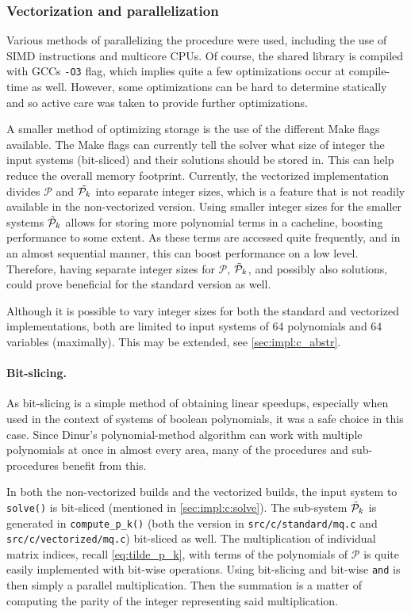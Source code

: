 \subsubsection{Vectorization and parallelization} \label{sec:impl:opt:parallel}
Various methods of parallelizing the procedure were used, including the use of SIMD instructions and multicore CPUs. Of course, the shared library is compiled with GCCs \texttt{-O3} flag, which implies quite a few optimizations occur at compile-time as well. However, some optimizations can be hard to determine statically and so active care was taken to provide further optimizations. 

A smaller method of optimizing storage is the use of the different Make flags available. The Make flags can currently tell the solver what size of integer the input systems (bit-sliced) and their solutions should be stored in. This can help reduce the overall memory footprint. Currently, the vectorized implementation divides $\mathcal{P}$ and $\Tilde{\mathcal{P}_k}$ into separate integer sizes, which is a feature that is not readily available in the non-vectorized version. Using smaller integer sizes for the smaller systems $\Tilde{\mathcal{P}}_k$ allows for storing more polynomial terms in a cacheline, boosting performance to some extent. As these terms are accessed quite frequently, and in an almost sequential manner, this can boost performance on a low level. Therefore, having separate integer sizes for $\mathcal{P}$, $\Tilde{\mathcal{P}}_k$, and possibly also solutions, could prove beneficial for the standard version as well.

Although it is possible to vary integer sizes for both the standard and vectorized implementations, both are limited to input systems of 64 polynomials and 64 variables (maximally). This may be extended, see \cref{sec:impl:c_abstr}.

\paragraph{Bit-slicing.} As bit-slicing is a simple method of obtaining linear speedups, especially when used in the context of systems of boolean polynomials, it was a safe choice in this case. Since Dinur's polynomial-method algorithm can work with multiple polynomials at once in almost every area, many of the procedures and sub-procedures benefit from this.

In both the non-vectorized builds and the vectorized builds, the input system to \texttt{solve()} is bit-sliced (mentioned in \cref{sec:impl:c:solve}). The sub-system $\Tilde{\mathcal{P}}_k$ is generated in \texttt{compute\_p\_k()} (both the version in \texttt{src/c/standard/mq.c} and \texttt{src/c/vectorized/mq.c}) bit-sliced as well. The multiplication of individual matrix indices, recall \cref{eq:tilde_p_k}, with terms of the polynomials of $\mathcal{P}$ is quite easily implemented with bit-wise operations. Using bit-slicing and bit-wise \texttt{and} is then simply a parallel multiplication. Then the summation is a matter of computing the parity of the integer representing said multiplication. 

